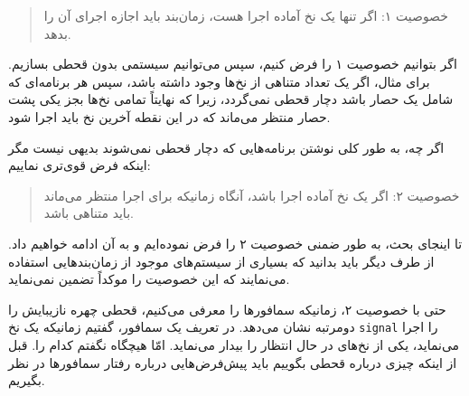 \documentclass{book}
\begin{document}
\begin{quote}
    خصوصیت ۱: اگر تنها یک نخ آماده اجرا هست، زمان‌بند باید اجازه اجرای آن را بدهد. 
\end{quote}

    اگر بتوانیم خصوصیت ۱ را فرض کنیم، سپس می‌توانیم سیستمی بدون قحطی بسازیم.
    برای مثال، اگر یک تعداد متناهی از نخ‌ها وجود داشته باشد، سپس هر برنامه‌ای که شامل یک حصار باشد دچار قحطی نمی‌گردد، زیرا که 
    نهایتاً تمامی نخ‌ها بجز یکی پشت حصار منتظر می‌ماند که در این نقطه آخرین نخ باید اجرا شود. 

    اگر چه، به طور کلی نوشتن برنامه‌هایی که دچار قحطی نمی‌شوند بدیهی نیست مگر اینکه فرض قوی‌تری نماییم:

\begin{quote}
    خصوصیت ۲: اگر یک نخ آماده اجرا باشد، آنگاه زمانیکه برای اجرا منتظر می‌ماند باید متناهی باشد. 
\end{quote}

    تا  اینجای بحث، به طور ضمنی خصوصیت ۲ را فرض نموده‌ایم و به آن ادامه خواهیم داد. 
    از طرف دیگر باید بدانید که بسیاری از سیستم‌های موجود از زمان‌بندهایی استفاده می‌نمایند که این خصوصیت را موکداً تضمین نمی‌نماید. 

    حتی با خصوصیت ۲، زمانیکه سمافورها را معرفی می‌کنیم، قحطی چهره نازیبایش را دومرتبه نشان می‌دهد. 
    در تعریف یک سمافور، گفتیم زمانیکه یک نخ {\tt signal} را اجرا می‌نماید، یکی از نخ‌های در حال انتظار را بیدار می‌نماید. امّا هیچگاه نگفتم کدام را. 
    قبل از اینکه چیزی 
    درباره قحطی بگوییم باید پیش‌فرض‌هایی درباره رفتار سمافورها در نظر بگیریم. 
\end{document}

